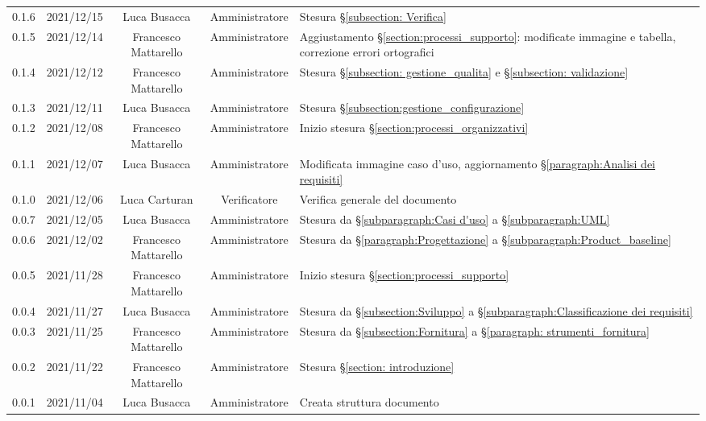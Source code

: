 \begin{center}
\begin{longtable}[c]{c | c | c | c | p{5cm}}
		0.1.6 & 2021/12/15 & Luca Busacca         & Amministratore & Stesura §\ref{subsection: Verifica} \\
		0.1.5 & 2021/12/14 & Francesco Mattarello & Amministratore & Aggiustamento §\ref{section:processi_supporto}: modificate immagine e tabella, correzione errori ortografici \\
		0.1.4 & 2021/12/12 & Francesco Mattarello & Amministratore & Stesura §\ref{subsection: gestione_qualita} e §\ref{subsection: validazione} \\
		0.1.3 & 2021/12/11 & Luca Busacca         & Amministratore & Stesura  §\ref{subsection:gestione_configurazione} \\
		0.1.2 & 2021/12/08 & Francesco Mattarello & Amministratore & Inizio stesura §\ref{section:processi_organizzativi} \\
		0.1.1 & 2021/12/07 & Luca Busacca         & Amministratore & Modificata immagine caso d'uso, aggiornamento §\ref{paragraph:Analisi dei requisiti} \\
		0.1.0 & 2021/12/06 & Luca Carturan 				& Verificatore   & Verifica generale del documento \\
		0.0.7 & 2021/12/05 & Luca Busacca         & Amministratore & Stesura da  §\ref{subparagraph:Casi d'uso} a §\ref{subparagraph:UML} \\
		0.0.6 & 2021/12/02 & Francesco Mattarello & Amministratore & Stesura da  §\ref{paragraph:Progettazione} a §\ref{subparagraph:Product_baseline} \\
		0.0.5 & 2021/11/28 & Francesco Mattarello & Amministratore & Inizio stesura §\ref{section:processi_supporto}\\
		0.0.4 & 2021/11/27 & Luca Busacca         & Amministratore & Stesura da §\ref{subsection:Sviluppo} a  §\ref{subparagraph:Classificazione dei requisiti} \\
		0.0.3 & 2021/11/25 & Francesco Mattarello & Amministratore & Stesura da §\ref{subsection:Fornitura} a §\ref{paragraph: strumenti_fornitura} \\
		0.0.2 & 2021/11/22 & Francesco Mattarello & Amministratore & Stesura §\ref{section: introduzione} \\
		0.0.1 & 2021/11/04 & Luca Busacca         & Amministratore & Creata struttura documento \\
	\end{longtable}
\end{center}
